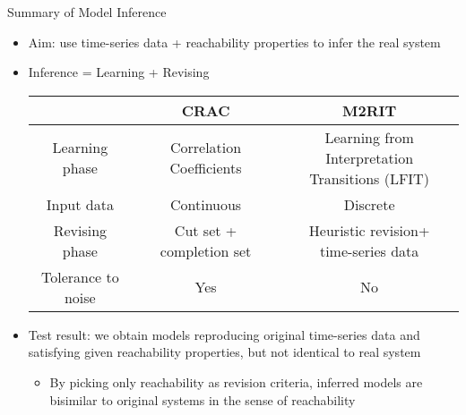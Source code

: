 \begin{frame}{Summary of Model Inference}    
\begin{itemize}
\item Aim: use time-series data + reachability properties to infer the real system
\pause
\item Inference = Learning + Revising
\pause
\begin{tabular}{c|c|c}
    &CRAC & M2RIT \\
    \hline
    Learning phase & Correlation Coefficients & \makecell{Learning from Interpretation\\ Transitions (LFIT)}
    \pause\\
    \hline
    Input data &Continuous & Discrete
    \pause\\
    \hline
    Revising phase & \makecell{Cut set +\\ completion set} & \makecell{Heuristic revision+\\time-series data}
    \pause\\
    \hline
    \makecell{Tolerance to\\ noise}&Yes&No
\end{tabular}
\pause
\item Test result: we obtain models reproducing original time-series data and satisfying given reachability properties, but not identical to real system
\pause
\begin{itemize}
    \item By picking only reachability as revision criteria, inferred models are bisimilar to original systems in the sense of reachability
\end{itemize}
\end{itemize}
\end{frame}
